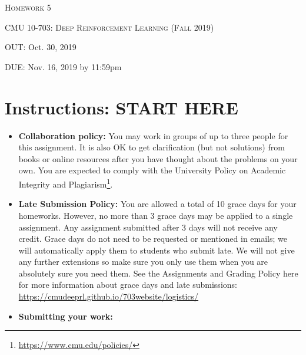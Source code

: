\documentclass[12pt]{article}
\begin{document}
\section*{}
\begin{center}
  \centerline{\textsc{\LARGE  Homework 5}}
  \vspace{1em}
  \textsc{\large CMU 10-703: Deep Reinforcement Learning (Fall 2019)} \\
  \centerline{OUT: Oct. 30, 2019}
  \centerline{DUE: Nov. 16, 2019 by 11:59pm}
\end{center}

\section*{Instructions: START HERE}
\begin{itemize}
\item \textbf{Collaboration policy:} You may work in groups of up to three people for this assignment. It is also OK to get clarification (but not solutions) from books or online resources after you have thought about the problems on your own.  You are expected to comply with the University Policy on Academic Integrity and Plagiarism\footnote{\url{https://www.cmu.edu/policies/}}.

\item\textbf{Late Submission Policy:} You are allowed a total of 10 grace days for your homeworks. However, no more than 3 grace days may be applied to a single assignment. Any assignment submitted after 3 days will not receive any credit.  Grace days do not need to be requested or mentioned in emails; we will automatically apply them to students who submit late. We will not give any further extensions so make sure you only use them when you are absolutely sure you need them.  See the Assignments and Grading Policy here for more information about grace days and late submissions: \url{https://cmudeeprl.github.io/703website/logistics/}

\item\textbf{Submitting your work:} 

\begin{itemize}



\end{itemize}
\end{itemize}
\end{document}
